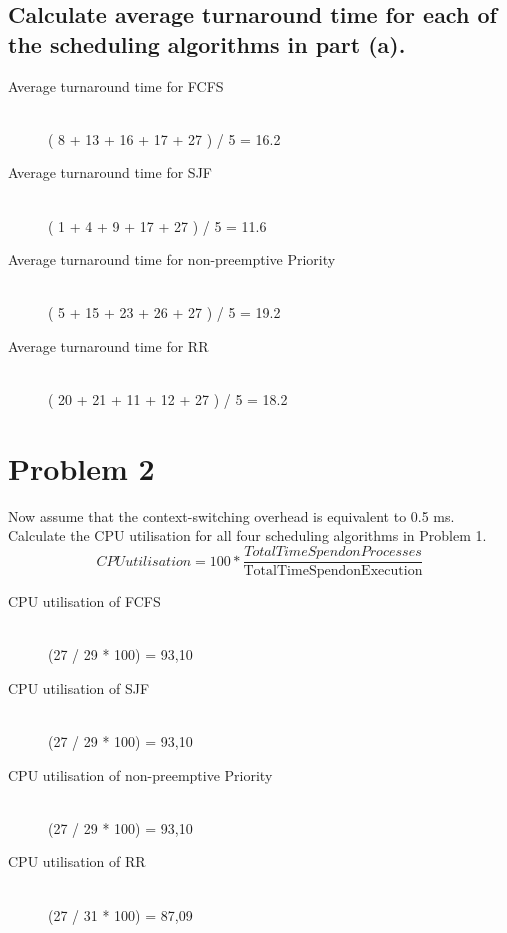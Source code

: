 \documentclass{article}
\begin{document}
\subsection{Calculate average turnaround time for each of the scheduling algorithms in part (a).}
\begin{description}
    \item[Average turnaround time for FCFS] \hfill 
\\( 8 + 13 + 16 + 17 + 27 ) / 5 = 16.2
    \item[Average turnaround time for SJF] \hfill 
\\( 1 + 4 + 9 + 17 + 27 ) / 5 = 11.6   
    \item[Average turnaround time for non-preemptive Priority] \hfill 
\\( 5 + 15 + 23 + 26 + 27 ) / 5 = 19.2  
    \item[Average turnaround time for RR] \hfill 
\\( 20 + 21 + 11 + 12 + 27 ) / 5 = 18.2
\end{description}

\section{Problem 2}
Now assume that the context-switching overhead is equivalent to 0.5 ms. Calculate the CPU utilisation for all four scheduling algorithms in Problem 1.
\\ 
\begin{equation*}
    CPU utilisation  = 100 * \frac{{Total Time Spend on Processes}}{\mathrm{Total Time Spend on Execution}}
\end{equation*}
\begin{description}
    \item[CPU utilisation of FCFS] \hfill \\ 
(27 / 29 * 100) = 93,10
    \item[CPU utilisation of SJF] \hfill \\
    (27 / 29 * 100) = 93,10
    \item[CPU utilisation of non-preemptive Priority] \hfill \\
    (27 / 29 * 100) = 93,10
    \item[CPU utilisation of RR] \hfill \\
(27 / 31 * 100) = 87,09
\end{description}
\end{document}
